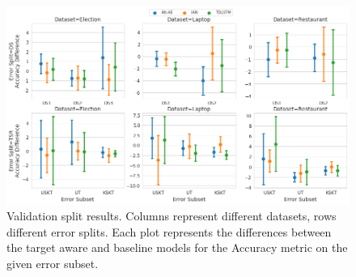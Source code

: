 \begin{figure}[!h]
    \centering
    \includegraphics[scale=0.42]{images/augmentation/methods_performance/Inter_Target/inter_target_encoding_split_overall_diff_validation.png}
    \caption{Validation split results. Columns represent different datasets, rows different error splits. Each plot represents the differences between the target aware and baseline models for the Accuracy metric on the given error subset.}
    \label{fig:aug_inter_target_encoding_split_overall_diff_validation}
\end{figure}